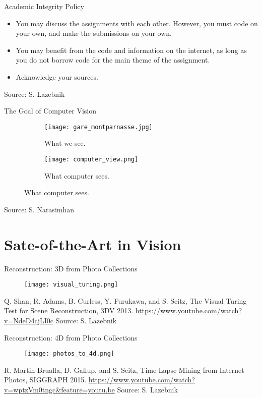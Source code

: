 \begin{frame}{Academic Integrity Policy}
    \begin{itemize}
      \item You may discuss the assignments with each other. However, you must code on your own, and make the submissions on your own.
      \item You may benefit from the code and information on the internet, as long as you do not borrow code for the main theme of the assignment.
      \item Acknowledge  your sources.
    \end{itemize}
    \vfill
    \scriptsize{Source: S. Lazebnik}
\end{frame}

\begin{frame}{The Goal of Computer Vision}
    \begin{figure}[ht]
      \centering
      \begin{subfigure}[b]{0.5\linewidth}
        \centering\texttt{[image: gare\_montparnasse.jpg]}
        \caption{What we see.}\label{sf:gare_montparnasse}
      \end{subfigure}%
      \begin{subfigure}[b]{0.5\linewidth}
        \centering\texttt{[image: computer\_view.png]}
        \caption{What computer sees.}\label{sf:computer_view}
      \end{subfigure}
    \end{figure}
    \vfill
    \scriptsize{Source: S. Narasimhan}
\end{frame}

\section{Sate-of-the-Art in Vision}

\begin{frame}{Reconstruction: 3D from Photo Collections}
    \begin{figure}[ht]
        \centering
        \texttt{[image: visual\_turing.png]}
    \end{figure}
    Q. Shan, R. Adams, B. Curless, Y. Furukawa, and S. Seitz, The Visual Turing Test for Scene Reconstruction, 3DV 2013.
    \url{https://www.youtube.com/watch?v=NdeD4cjLI0c}
    \vfill
    \scriptsize{Source: S. Lazebnik}
\end{frame}

\begin{frame}{Reconstruction: 4D from Photo Collections}
    \begin{figure}[ht]
        \centering
        \texttt{[image: photos\_to\_4d.png]}
    \end{figure}
    R. Martin-Brualla, D. Gallup, and S. Seitz, Time-Lapse Mining from Internet Photos, SIGGRAPH 2015.
    \url{https://www.youtube.com/watch?v=wptzVm0tngc&feature=youtu.be}
    \vfill
    \scriptsize{Source: S. Lazebnik}
\end{frame}

